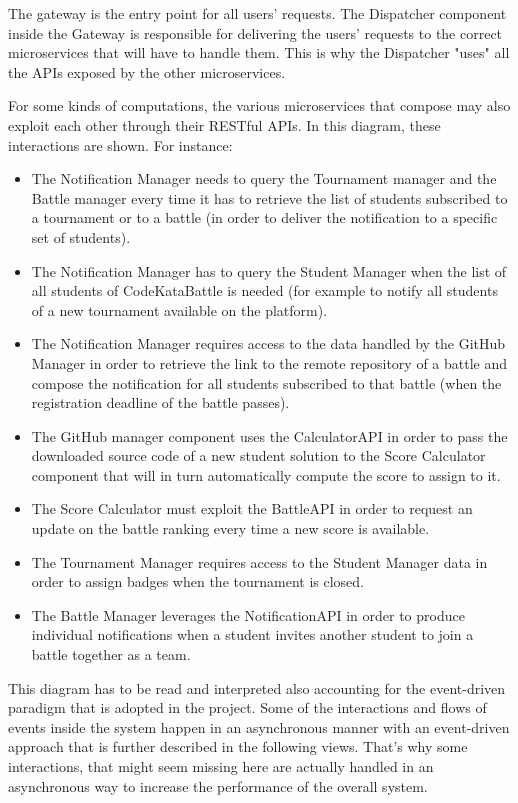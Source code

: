 The gateway is the entry point for all users’ requests. The Dispatcher component inside the Gateway is responsible for delivering the users' requests to the correct microservices that will have to handle them. This is why the Dispatcher "uses" all the APIs exposed by the other microservices. 

For some kinds of computations, the various microservices that compose \app may also exploit each other through their RESTful APIs. In this diagram, these interactions are shown. 
For instance:
\begin{itemize}
	\item The Notification Manager needs to query the Tournament manager and the Battle manager every time it has to retrieve the list of students subscribed to a tournament or to a battle (in order to deliver the notification to a specific set of students).
	\item The Notification Manager has to query the Student Manager when the list of all students of CodeKataBattle is needed (for example to notify all students of a new tournament available on the platform).
	\item The Notification Manager requires access to the data handled by the GitHub Manager in order to retrieve the link to the remote repository of a battle and compose the notification for all students subscribed to that battle (when the registration deadline of the battle passes).
	\item The GitHub manager component uses the CalculatorAPI in order to pass the downloaded source code of a new student solution to the Score Calculator component that will in turn automatically compute the score to assign to it.
	\item The Score Calculator must exploit the BattleAPI in order to request an update on the battle ranking every time a new score is available.
	\item The Tournament Manager requires access to the Student Manager data in order to assign badges when the tournament is closed.
	\item The Battle Manager leverages the NotificationAPI in order to produce individual notifications when a student invites another student to join a battle together as a team.
\end{itemize}

This diagram has to be read and interpreted also accounting for the event-driven paradigm that is adopted in the project. Some of the interactions and flows of events inside the system happen in an asynchronous manner with an event-driven approach that is further described in the following views. That's why some interactions, that might seem missing here are actually handled in an asynchronous way to increase the performance of the overall system.

